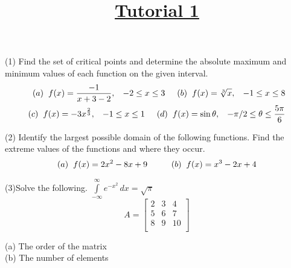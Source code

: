\documentclass[11pt]{article}
\title{\huge{\underline{\textbf{Tutorial 1}}}}
\begin{document}
\maketitle
(1) Find the set of critical points and determine the absolute maximum and minimum
values of each function on the given interval.
\begin{align*}
(a)\hspace{2mm}  f(x) = \frac{-1}{x+3-2}   , \hspace{3mm}  -2 \le x \le 3 \hspace{5mm}
(b)\hspace{2mm}  f(x) = \sqrt[3]{x}  , \hspace{3mm}  -1 \le x \le 8\\
(c)\hspace{2mm} f(x) = -3x^\frac{2}{3} , \hspace{3mm} -1 \le x \le 1 \hspace{5mm}
(d) \hspace{2mm} f(x) = \sin{\theta} , \hspace{3mm} -\pi/2 \le \theta \le \frac{5\pi}{6}
\end{align*}

(2) Identify the largest possible domain of the following functions. Find the extreme values of the functions and where they occur.
\begin{align*}
(a) \hspace{2mm} f(x) = 2x^2-8x+9 \hspace{10mm} (b) \hspace{2mm} f(x) = x^3-2x+4
\end{align*}

(3)Solve the following.
$\int\limits_{-\infty}^{\infty} e^{-x^{2}}\, dx = \sqrt{\pi}$
\begin{equation*}
A=
\begin{bmatrix}
2 & 3 & 4\\
5 & 6 & 7\\
8 & 9 & 10\\
\end{bmatrix}
\end{equation*}
\begin{center}
(a) The order of the matrix\\
(b) The number of elements\\
\end{center} 
\end{document}
